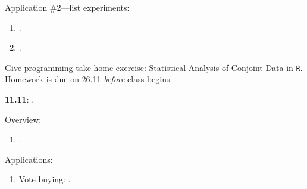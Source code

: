 \documentclass[letterpaper]{article}
\renewenvironment{itemize}{
  \begin{list}{}{
    \setlength{\leftmargin}{1.5em}
  }
}{
  \end{list}
}
\begin{document}
\begin{enumerate}
\begin{itemize}
        \item[$\diamond$] Application \#2---list experiments:

          \begin{enumerate}

              \item[$\bullet$] \href{https://doi.org/10.1093/pan/mpr048}{}.

              \item[$\bullet$] \href{https://link.springer.com/10.1057/s41269-020-00174-4}{}.

          \end{enumerate}

       \item[{\color{red}$\diamond$}] {\color{red}Give programming take-home exercise: Statistical Analysis of Conjoint Data in \texttt{R}. Homework is \underline{due on 26.11} \emph{before} class begins}.

      \end{itemize}


  \item {\bf 11.11}:  {\color{ForestGreen}{\bf Lab Experiments}}.

        \begin{itemize} 

        \item[$\diamond$] Overview:

        \begin{enumerate}
          \item[$\bullet$] \href{https://doi.org/10.1017/gov.2018.14}{}.

          
        \end{enumerate}

       \item[$\diamond$] Applications:

           \begin{enumerate}

           \item[$\bullet$] Vote buying: \href{https://doi.org/10.1016/j.electstud.2022.102497}{}.


\end{enumerate}
\end{itemize}
\end{enumerate}
\end{document}

